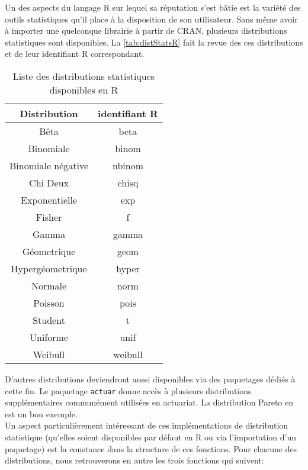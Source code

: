 Un des aspects du langage R sur lequel sa réputation s'est bâtie est la variété des outils statistiques qu'il place à la disposition de son utilisateur. Sans même avoir à importer une quelconque librairie à partir de CRAN, plusieurs distributions statistiques sont disponibles. La \autoref{tab:distStatsR} fait la revue des ces distributions et de leur identifiant R correspondant. \cite{distStatsR} \\

\begin{table}[h]
	\centering
	\begin{tabular}{cc}
		\textbf{Distribution} & \textbf{identifiant R} \\
		\hline
		Bêta & beta \\
		Binomiale & binom \\
		Binomiale négative & nbinom \\
		Chi Deux & chisq \\
		Exponentielle & exp \\
		Fisher & f \\
		Gamma & gamma \\
		Géometrique & geom \\
		Hypergéometrique & hyper \\
		Normale & norm \\
		Poisson & pois \\
		Student & t \\
		Uniforme & unif \\
		Weibull & weibull	
	\end{tabular}
	\caption{Liste des distributions statistiques disponibles en R}
\end{table}
\label{tab:distStatsR}

D'autres distributions deviendront aussi disponibles via des paquetages dédiés à cette fin. Le paquetage \texttt{actuar} \cite{Rpackage:actuar} donne accès à plusieurs distributions supplémentaires communément utilisées en actuariat. La distribution Pareto en est un bon exemple. \\

Un aspect particulièrement intéressant de ces implémentations de distribution statistique (qu'elles soient disponibles par défaut en R ou via l'importation d'un paquetage) est la constance dans la structure de ces fonctions. Pour chacune des distributions, nous retrouverons en autre les trois fonctions qui suivent: \\

